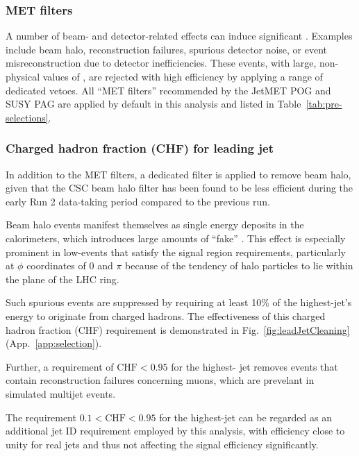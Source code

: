 \subsubsection{MET filters}
\label{sec:metfilters}

A number of beam- and detector-related effects can induce significant
\met. Examples include beam halo, reconstruction failures, spurious
detector noise, or event misreconstruction due to detector
inefficiencies. These events, with large, non-physical values of \met,
are rejected with high efficiency by applying a range of dedicated
vetoes. All ``MET filters'' recommended by the JetMET POG and SUSY PAG
are applied by default in this analysis and listed in
Table~\ref{tab:pre-selections}.

\subsubsection{Charged hadron fraction (CHF) for leading jet}
\label{sec:chf}

In addition to the MET filters, a dedicated filter is applied to
remove beam halo, given that the CSC beam halo filter has been found
to be less efficient during the early Run 2 data-taking period
compared to the previous run.

Beam halo events manifest themselves as single energy deposits in the
calorimeters, which introduces large amounts of ``fake'' \met. This
effect is especially prominent in low-\njet events that satisfy the
signal region requirements, particularly at $\phi$ coordinates of 0
and $\pi$ because of the tendency of halo particles to lie within the
plane of the LHC ring.

Such spurious events are suppressed by requiring at least 10\% of 
the highest-\Pt jet's energy to originate from charged
hadrons. The effectiveness of this charged hadron fraction (CHF)
requirement is demonstrated in Fig.~\ref{fig:leadJetCleaning}
(App.~\ref{app:selection}). 

Further, a requirement of $\mathrm{CHF} < 0.95$ for the highest-\Pt
jet removes events that contain reconstruction failures concerning
muons, which are prevelant in simulated multijet events.


The requirement $0.1 < \mathrm{CHF} < 0.95$ for the highest-\Pt jet
can be regarded as an additional jet ID requirement employed by this
analysis, with efficiency close to unity for real jets and thus not
affecting the signal efficiency significantly.

